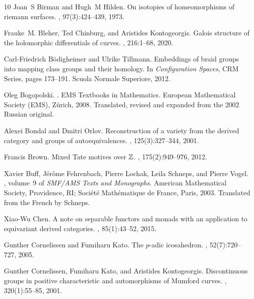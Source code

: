 \documentclass[10pt]{amsart}
\theoremstyle{definition}
\begin{document}
\begin{thebibliography}{10}
Joan~S Birman and Hugh~M Hilden.
\newblock On isotopies of homeomorphisms of riemann surfaces.
, 97(3):424--439, 1973.

Frauke~M. Bleher, Ted Chinburg, and Aristides Kontogeorgis.
\newblock Galois structure of the holomorphic differentials of curves.
, 216:1--68, 2020.

Carl-Friedrich B{\"{o}}digheimer and Ulrike Tillmann.
\newblock Embeddings of braid groups into mapping class groups and their
  homology.
\newblock In {\em Configuration Spaces}, CRM Series, pages 173--191. Scuola
  Normale Superiore, 2012.

Oleg Bogopolski.
.
\newblock EMS Textbooks in Mathematics. European Mathematical Society (EMS),
  Z\"urich, 2008.
\newblock Translated, revised and expanded from the 2002 Russian original.

Alexei Bondal and Dmitri Orlov.
\newblock Reconstruction of a variety from the derived category and groups of
  autoequivalences.
, 125(3):327--344, 2001.

Francis Brown.
\newblock Mixed {T}ate motives over {$\Bbb Z$}.
, 175(2):949--976, 2012.

Xavier Buff, J\'er\^ome Fehrenbach, Pierre Lochak, Leila Schneps, and Pierre
  Vogel.
,
  volume~9 of {\em SMF/AMS Texts and Monographs}.
\newblock American Mathematical Society, Providence, RI; Soci\'et\'e{}
  Math\'ematique de France, Paris, 2003.
\newblock Translated from the French by Schneps.

Xiao-Wu Chen.
\newblock A note on separable functors and monads with an application to
  equivariant derived categories.
, 85(1):43--52, 2015.

Gunther Cornelissen and Fumiharu Kato.
\newblock The {$p$}-adic icosahedron.
, 52(7):720--727, 2005.

Gunther Cornelissen, Fumiharu Kato, and Aristides Kontogeorgis.
\newblock Discontinuous groups in positive characteristic and automorphisms of
  {M}umford curves.
, 320(1):55--85, 2001.


\end{thebibliography}
\end{document}
